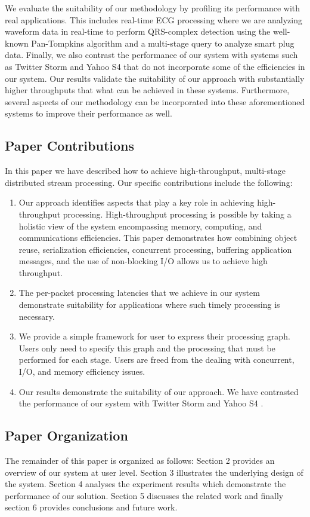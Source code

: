 We evaluate the suitability of our methodology by profiling its performance with real applications. This includes real-time ECG processing where we are analyzing waveform data in real-time to perform QRS-complex detection using the well-known Pan-Tompkins \cite{kohler2002principles} algorithm and a multi-stage query to analyze smart plug data. Finally, we also contrast the performance of our system with systems such as Twitter Storm \cite{toshniwal2014storm} and  Yahoo S4 \cite{neumeyer2010s4} that do not incorporate some of the efficiencies in our system. Our results validate the suitability of our approach with substantially higher throughputs that what can be achieved in these systems. Furthermore, several aspects of our methodology can be incorporated into these aforementioned systems to improve their performance as well. 


\subsection{Paper Contributions}
In this paper we have described how to achieve high-throughput, multi-stage distributed stream processing. Our specific contributions include the following:
\begin{enumerate}
	\item Our approach identifies aspects that play a key role in achieving high-throughput processing. High-throughput processing is possible by taking a holistic view of the system encompassing memory, computing, and communications efficiencies. This paper demonstrates how combining object reuse, serialization efficiencies, concurrent processing, buffering application messages, and the use of non-blocking I/O allows us to achieve high throughput. 
	\item The per-packet processing latencies that we achieve in our system demonstrate suitability for applications where such timely processing is necessary.
	\item We provide a simple framework for user to express their processing graph. Users only need to specify this graph and the processing that must be performed for each stage. Users are freed from the dealing with concurrent, I/O, and memory efficiency issues. 
	\item Our results demonstrate the suitability of our approach. We have contrasted the performance of our system with Twitter Storm \cite{toshniwal2014storm} and  Yahoo S4 \cite{neumeyer2010s4}.
\end{enumerate}

\subsection{Paper Organization}
The remainder of this paper is organized as follows: Section 2 provides an overview of our system at user level. Section 3 illustrates the underlying design of the system. Section 4 analyses the experiment results which demonstrate the performance of our solution. Section 5 discusses the related work and finally section 6 provides conclusions and future work.
